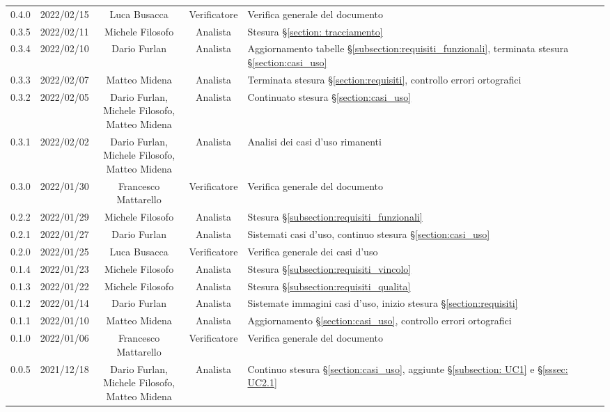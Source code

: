 \begin{center}
\begin{longtable}[c]{c | c | c | c | p{5cm}}
		0.4.0 & 2022/02/15 & Luca Busacca & Verificatore & Verifica generale del documento\\
		0.3.5 & 2022/02/11 & Michele Filosofo & Analista & Stesura §\ref{section: tracciamento}\\
		0.3.4 & 2022/02/10 & Dario Furlan & Analista & Aggiornamento tabelle §\ref{subsection:requisiti_funzionali}, terminata stesura §\ref{section:casi_uso} \\
		0.3.3 & 2022/02/07 & Matteo Midena & Analista & Terminata stesura §\ref{section:requisiti}, controllo errori ortografici \\
		0.3.2 & 2022/02/05 & \Shortunderstack{Dario Furlan,\\Michele Filosofo,\\Matteo Midena\\} & Analista & Continuato stesura §\ref{section:casi_uso} \\
		0.3.1 & 2022/02/02 & \Shortunderstack{Dario Furlan,\\Michele Filosofo,\\Matteo Midena\\} & Analista & Analisi dei casi d'uso rimanenti \\
		0.3.0 & 2022/01/30 & Francesco Mattarello & Verificatore & Verifica generale del documento\\
		0.2.2 & 2022/01/29 & Michele Filosofo & Analista & Stesura §\ref{subsection:requisiti_funzionali}\\
		0.2.1 & 2022/01/27 & Dario Furlan & Analista & Sistemati casi d'uso, continuo stesura §\ref{section:casi_uso}\\
		0.2.0 & 2022/01/25 & Luca Busacca & Verificatore & Verifica generale dei casi d'uso\\
		0.1.4 & 2022/01/23 & Michele Filosofo & Analista & Stesura §\ref{subsection:requisiti_vincolo}\\
		0.1.3 & 2022/01/22 & Michele Filosofo & Analista & Stesura §\ref{subsection:requisiti_qualita}\\
		0.1.2 & 2022/01/14 & Dario Furlan & Analista & Sistemate immagini casi d'uso, inizio stesura §\ref{section:requisiti}\\
		0.1.1 & 2022/01/10 & Matteo Midena & Analista & Aggiornamento §\ref{section:casi_uso}, controllo errori ortografici\\
		0.1.0 & 2022/01/06 & Francesco Mattarello & Verificatore & Verifica generale del documento\\
		0.0.5 & 2021/12/18 & \Shortunderstack{Dario Furlan,\\Michele Filosofo,\\Matteo Midena\\} & Analista & Continuo stesura §\ref{section:casi_uso}, aggiunte §\ref{subsection: UC1} e §\ref{sssec: UC2.1}\\

\end{longtable}
\end{center}
